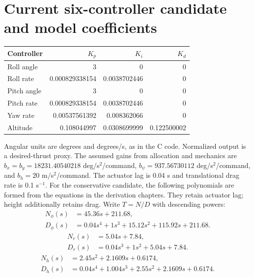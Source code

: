 \section{Current six-controller candidate and model coefficients}
\begin{center}\begin{tabular}{lrrr}\toprule Controller & $K_p$ & $K_i$ & $K_d$\\\midrule
Roll angle & 3 & 0 & 0\\
Roll rate & 0.000829338154 & 0.0038702446 & 0\\
Pitch angle & 3 & 0 & 0\\
Pitch rate & 0.000829338154 & 0.0038702446 & 0\\
Yaw rate & 0.00537561392 & 0.008362066 & 0\\
Altitude & 0.108044997 & 0.0308699999 & 0.122500002\\
\bottomrule\end{tabular}\end{center}
Angular units are degrees and degrees/s, as in the C code. Normalized output
is a desired-thrust proxy. The assumed gains from allocation and mechanics are
$b_x=b_y=18231.40540218$ deg/s$^2$/command, $b_\psi=937.56730112$ deg/s$^2$/command, and $b_h=20$ m/s$^2$/command. The actuator lag is 0.04 s and translational drag rate is 0.1 s$^{-1}$.
For the conservative candidate, the following polynomials are
formed from the equations in the derivation chapters. They retain actuator lag;
height additionally retains drag. Write $T=N/D$ with descending powers:
\begin{align}
N_{\phi}(s)&=45.36s+211.68,\\
D_{\phi}(s)&=0.04 s^{4}+1s^{3}+15.12s^{2}+115.92s+211.68.
\end{align}
\begin{align}
N_{r}(s)&=5.04s+7.84,\\
D_{r}(s)&=0.04 s^{3}+1s^{2}+5.04s+7.84.
\end{align}
\begin{align}
N_{h}(s)&=2.45s^{2}+2.1609s+0.6174,\\
D_{h}(s)&=0.04 s^{4}+1.004s^{3}+2.55s^{2}+2.1609s+0.6174.
\end{align}

